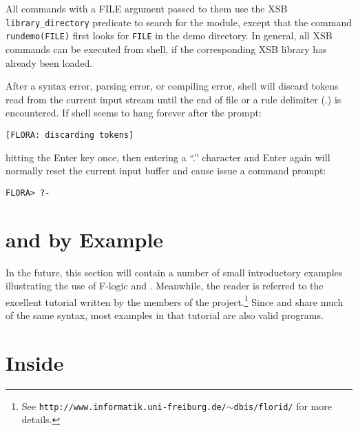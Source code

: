 \documentclass[11pt]{report}
\begin{document}
\addtocounter{footnote}{-3}
\addtocounter{footnote}{1}
\addtocounter{footnote}{1}
\addtocounter{footnote}{1}

All commands with a FILE argument passed to them use the XSB {\tt library\_directory}
predicate to search for the module, except that the command {\tt rundemo(FILE)}
first looks for {\tt FILE} in the \FLORA demo directory. In general, all XSB commands
can be executed from \FLORA shell, if the corresponding XSB library has already been
loaded.

After a syntax error, parsing error, or compiling error, \FLORA shell will
discard tokens read from the current input stream until the end of file or a
rule delimiter (.) is encountered. If \FLORA shell seems to hang forever
after the prompt:
\begin{verbatim}
[FLORA: discarding tokens]
\end{verbatim}
hitting the Enter key once, then entering a ``.'' character and Enter again
will normally reset the current input buffer and cause \FLORA issue a
command prompt:
\begin{verbatim}
FLORA> ?-
\end{verbatim}

 
\section{\fl and \FLORA by Example}

In the future, this section will contain a number of small
introductory examples illustrating the use of F-logic and \FLORA. Meanwhile, the
reader is referred to the excellent tutorial written by the members of the
\FLORID project.\footnote{
  See {\tt http://www.informatik.uni-freiburg.de/$\sim$dbis/florid/} for more
  details.
  }
Since \FLORA and \FLORID share much of the same syntax, most examples in that
tutorial are also valid \FLORA programs.



\section{Inside \FLORA}
\end{document}
